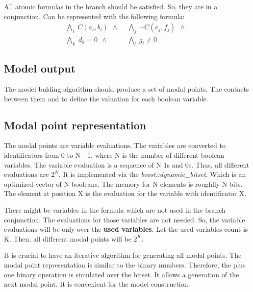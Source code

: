\documentclass{article}
\begin{document}
	All atomic formulas in the branch should be satisfied. So, they are in a conjunction. Can be represented with the following formula:
	\begin{align*}
		\bigwedge\nolimits_{i} \; C(a_i, b_i) \:\: \wedge \:\: &
		\bigwedge\nolimits_{j} \; \neg C(e_j, f_j) \:\: \wedge \:\: \\
		\bigwedge\nolimits_{k} \; d_k = 0 \:\: \wedge \:\: &
		\bigwedge\nolimits_{l} \; g_l \neq 0
	\end{align*}

	\subsection*{Model output}
	\label{tableau:branch:output}
	The model bulding algorithm should produce a set of modal points. The contacts between them and to define the valuation for each boolean variable.

	\subsection{Modal point representation}
	The modal points are variable evaluations. The variables are converted to  identificators from 0 to N - 1, where N is the number of different boolean variables. The variable evaluation is a sequence of N 1s and 0s. Thus, all different evaluations are $2^N$. It is implemented via the \textit{boost::dynamic\_bitset}. Which is an optimized vector of N booleans. The memory for N elements is roughfly N bits. The element at position X is the evaluation for the variable with identificator X. 

	There might be variables in the formula which are not used in the branch conjunction. The evaluations for those variables are not needed. So, the variable evaluations will be only over the \textbf{used variables}. Let the used variables count is K. Then, all different modal points will be $2^K$.

	It is crucial to have an iterative algorithm for generating all modal points. The modal point representation is similar to the binary numbers. Therefore, the plus one binary operation is simulated over the bitset. It allows a generation of the next modal point. It is convenient for the model construction.
\end{document}
